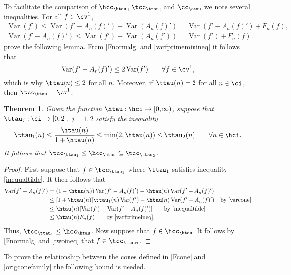 \documentclass[]{elsarticle}
\DeclareMathOperator{\Var}{Var}
\newtheorem{theorem}{Theorem}
\theoremstyle{definition}
\theoremstyle{remark}
\begin{document}
To facilitate the comparison of  $\hcc_{\htau}$,  $\tcc_{\ttau}$, and $\cc_{\otau}$ we note several inequalities. For all $f \in \cv^1$,
\begin{gather}
\label{varfprimeineq}
\Var(f') \le \Var(f'-A_n(f)') + \Var(A_n(f)') = \Var(f'-A_n(f)') + F_n(f), \\
\label{varfprimeminineq}
\Var(f'-A_n(f)') \le \Var(f')+ \Var(A_n(f')) = \Var(f')+ F_n(f).
\end{gather} prove the following lemma.
From \eqref{Fnormalg} and \eqref{varfprimeminineq} it follows that 
\begin{equation} \label{twoineq}
\Var(f'-A_n(f)') \le 2\Var(f') \qquad \forall f \in \cv^1,
\end{equation}
which is why $\ttau(n) \le 2$ for all $n$. Moreover, if $\ttau(n) = 2$ for all $n \in \ci$, then $\tcc_{\ttau}=\cv^1$.

\begin{theorem} \label{twoinclusiontildethm} Given the function $\htau:\hci \to [0,\infty)$, suppose that $\ttau_j : \ci \to [0,2]$, $j=1,2$ satisfy the inequality
\begin{equation} \label{inequaltilde}
\ttau_1(n) \le \frac{\htau(n)}{1+\htau(n)} \le \min(2,\htau(n)) \le \ttau_2(n) \qquad \forall  n \in \hci.
\end{equation}
It follows that $\tcc_{\ttau_1} \le \hcc_{\htau} \subseteq \tcc_{\ttau_2}$.
\end{theorem}

\begin{proof} First suppose that $f \in \tcc_{\ttau_1}$ where $\ttau_1$ satisfies inequality \eqref{inequaltilde}.  It then follows that
\begin{align*}
\Var(f'-A_n(f)') & = (1+\htau(n)) \Var(f'-A_n(f)') - \htau(n) \Var(f'-A_n(f)')\\
& \le [1+\htau(n)] \ttau_1(n) \Var(f') - \htau(n) \Var(f'-A_n(f)') \quad \text{by \eqref{varcone}}\\
& \le \htau(n)[ \Var(f') - \Var(f'-A_n(f)')] \qquad \text{by \eqref{inequaltilde}}\\
& \le \htau(n)F_n(f) \qquad \text{by \eqref{varfprimeineq}}.
\end{align*}
Thus, $\tcc_{\ttau_1} \le \hcc_{\htau}$.  Now suppose that $f \in \hcc_{\htau}$.  It follows by \eqref{Fnormalg} and \eqref{twoineq} that $f \in \tcc_{\ttau_2}$.
\end{proof}

To prove the relationship between the cones defined in \eqref{Fcone} and \eqref{origconefamily} the following bound is needed.   
\end{document}
